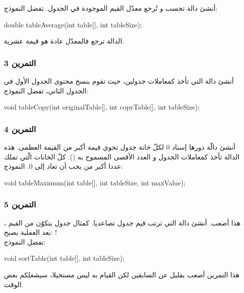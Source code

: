 أنشئ دالة
تحسب و تُرجع معدّل القيم الموجودة في الجدول. تفضل النموذج:

\begin{Csource}
double tableAverage(int table[], int tableSize);
\end{Csource}

الدالة ترجع
فالمعدّل عادة هو قيمة عشرية.

\subsubsection{التمرين 3}

أنشئ دالة
التي تأخذ كمعاملات جدولين، حيث تقوم بنسخ محتوى الجدول الأول في الجدول الثاني، تفضل النموذج:

\begin{Csource}
void tableCopy(int originalTable[], int copyTable[], int tableSize);
\end{Csource}

\subsubsection{التمرين 4}

أنشئ دالّة
دورها إسناد 0 لكلّ خانة جدول تحوي قيمة أكبر من القيمة العظمى. هذه الدالة تأخذ كمعاملات الجدول و العدد الأقصى المسموح به
().
كلّ الخانات الّتي تملك عددا أكبر من
يجب أن تعاد إلى 0. النموذج:

\begin{Csource}
void tableMaximum(int table[], int tableSize, int maxValue);
\end{Csource}

\subsubsection{التمرين 5}

هذا أصعب. أنشئ دالة
التي ترتب قيم جدول تصاعديا. كمثال جدول يتكوّن من القيم
،
بعد العملية يصبح:
!\\
تفضل النموذج:

\begin{Csource}
void sortTable(int table[], int tableSize);
\end{Csource}

هذا التمرين أصعب بقليل عن السابقين لكن القيام به ليس مستحيلا، سيشغلكم بعض الوقت.

